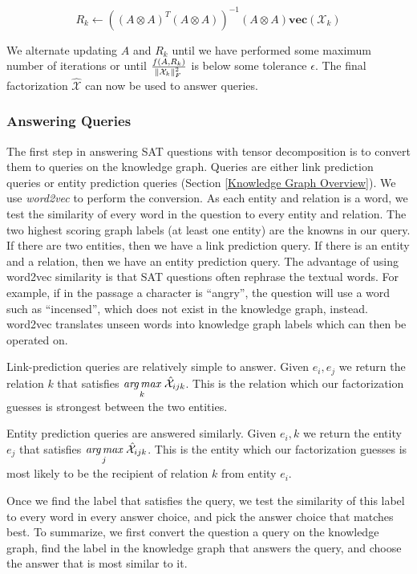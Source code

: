 \documentclass[pageno]{final_paper}
\begin{document}
$$R_k \leftarrow \left( \left(A \otimes A \right)^T \left(A \otimes A\right)
 \right) ^{-1} \left(A \otimes A\right) \textbf{vec}\left(\mathcal{X}_k\right)$$

We alternate updating $A$ and $R_k$ until we have performed some maximum number
of iterations or until $\frac{f(A, R_k)}{\norm{\mathcal{X}_k}_F^2}$ is below
some tolerance $\epsilon$. The final factorization $\hat{\mathcal{X}}$ can now
be used to answer queries.

\subsubsection{Answering Queries}
\label{Answering Queries}

The first step in answering SAT questions with tensor decomposition is to
convert them to queries on the knowledge graph. Queries are either link
prediction queries or entity prediction queries (Section \ref{Knowledge Graph
Overview}). We use \textit{word2vec} to perform the conversion. As each entity
and relation is a word, we test the similarity of every word in the question to
every entity and relation. The two highest scoring graph labels (at least one
entity) are the knowns in our query. If there are two entities, then we have a
link prediction query. If there is an entity and a relation, then we have an
entity prediction query. The advantage of using word2vec similarity is that SAT
questions often rephrase the textual words. For example, if in the passage a
character is ``angry'', the question will use a word such as ``incensed'', which
does not exist in the knowledge graph, instead. word2vec translates unseen words
into  knowledge graph labels which can then be operated on.

Link-prediction queries are relatively simple to answer. Given $e_i, e_j$ we
return the relation $k$ that satisfies $\underset{k}{{\textit{arg}}\,{\textit{max}}}\,\, \hat{\mathcal{X}}_{ijk}$.
This is the relation which our factorization guesses is strongest between the
two entities.

Entity prediction queries are answered similarly. Given $e_i, k$ we return the
entity $e_j$ that satisfies $\underset{j}{{\textit{arg}}\,{\textit{max}}}\,\, \hat{\mathcal{X}}_{ijk}$. This is
the entity which our factorization guesses is most likely to be the recipient of
relation $k$ from entity $e_i$.

Once we find the label that satisfies the query, we test the similarity of this
label to every word in every answer choice, and pick the answer choice that
matches best. To summarize, we first convert the question a query on the
knowledge graph, find the label in the knowledge graph that answers the query,
and choose the answer that is most similar to it.
\end{document}
